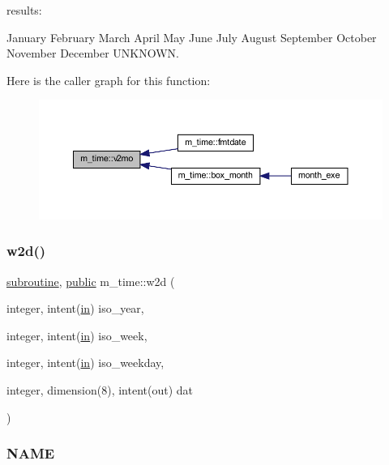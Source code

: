\begin{DoxyVerb}
\begin{DoxyVerb}
results:

 January
 February
 March
 April
 May
 June
 July
 August
 September
 October
 November
 December
 UNKNOWN. \end{DoxyVerb}
 Here is the caller graph for this function\+:
\nopagebreak
\begin{figure}[H]
\begin{center}
\leavevmode
\includegraphics[width=350pt]{namespacem__time_a6f28cf00e4998bb50bb503f5e4bd3f77_icgraph}
\end{center}
\end{figure}
\mbox{\label{namespacem__time_ac0ec48db8d508bfa23fe4b20c9d1c5a3}} 
\subsubsection{\texorpdfstring{w2d()}{w2d()}}
{\footnotesize\ttfamily \hyperlink{M__stopwatch_83_8txt_acfbcff50169d691ff02d4a123ed70482}{subroutine}, \hyperlink{M__stopwatch_83_8txt_a2f74811300c361e53b430611a7d1769f}{public} m\+\_\+time\+::w2d (\begin{DoxyParamCaption}\item[{integer, intent(\hyperlink{M__journal_83_8txt_afce72651d1eed785a2132bee863b2f38}{in})}]{iso\+\_\+year,  }\item[{integer, intent(\hyperlink{M__journal_83_8txt_afce72651d1eed785a2132bee863b2f38}{in})}]{iso\+\_\+week,  }\item[{integer, intent(\hyperlink{M__journal_83_8txt_afce72651d1eed785a2132bee863b2f38}{in})}]{iso\+\_\+weekday,  }\item[{integer, dimension(8), intent(out)}]{dat }\end{DoxyParamCaption})}



\subsubsection*{N\+A\+ME}


\end{DoxyVerb}
